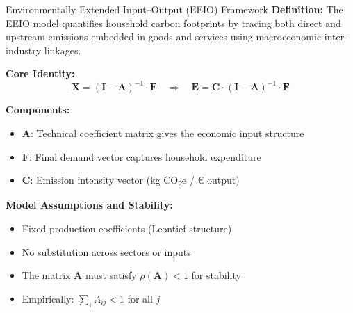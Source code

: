 \documentclass{beamer}
\begin{document}
\begin{frame}{Environmentally Extended Input–Output (EEIO) Framework}
\footnotesize
\vspace{-2.5em}
\textbf{Definition:}  
The EEIO model quantifies household carbon footprints by tracing both direct and upstream emissions embedded in goods and services using macroeconomic inter-industry linkages.

\vspace{0.5em}
\textbf{Core Identity:}
\[
\mathbf{X} = (\mathbf{I} - \mathbf{A})^{-1} \cdot \mathbf{F}
\quad
\Rightarrow
\quad
\mathbf{E} = \mathbf{C} \cdot (\mathbf{I} - \mathbf{A})^{-1} \cdot \mathbf{F}
\]

\vspace{0.5em}
\textbf{Components:}
\begin{itemize}
  \item \( \mathbf{A} \): Technical coefficient matrix gives the economic input structure
  \item \( \mathbf{F} \): Final demand vector captures household expenditure
  \item \( \mathbf{C} \): Emission intensity vector (kg CO\textsubscript{2}e / € output)
\end{itemize}

\vspace{0.5em}
\vspace{0.5em}
\textbf{Model Assumptions and Stability:}
\begin{itemize}
  \item Fixed production coefficients (Leontief structure)
  \item No substitution across sectors or inputs
  \item The matrix \( \mathbf{A} \) must satisfy \( \rho(\mathbf{A}) < 1 \) for stability
  \item Empirically: \( \sum_i A_{ij} < 1 \) for all \( j \)
\end{itemize}

\end{frame}
\end{document}
